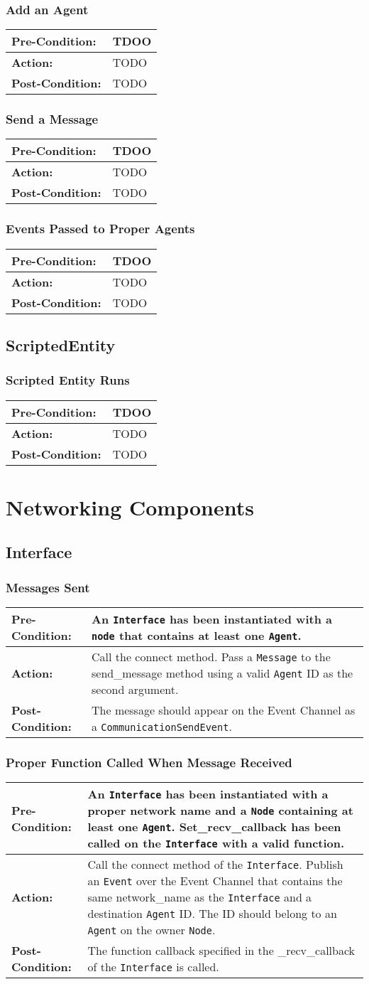 \documentclass[titlepage]{article}
\newcommand{\testcase}[3]{
    \begin{center}
    \begin{tabular}{| l | p{0.7\textwidth}|}
        \hline
        \rowcolor[gray]{0.8}\textbf{Pre-Condition:} & #1 \\ \hline
        \textbf{Action:} & #2 \\ \hline
        \rowcolor[gray]{0.8}\textbf{Post-Condition:} & #3 \\ \hline
    \end{tabular}
    \end{center}
}
\begin{document}
\subsubsection{Add an Agent}
\testcase{TDOO}{TODO}{TODO}

\subsubsection{Send a Message}
\testcase{TDOO}{TODO}{TODO}

\subsubsection{Events Passed to Proper Agents}
\testcase{TDOO}{TODO}{TODO}

\subsection{ScriptedEntity}
\subsubsection{Scripted Entity Runs}
\testcase{TDOO}{TODO}{TODO}


\section{Networking Components}
\subsection{Interface}
\subsubsection{Messages Sent}
\testcase{An \texttt{Interface} has been instantiated with a \texttt{node} that contains at least one
\texttt{Agent}.}{Call the connect method. Pass a \texttt{Message} to the send\_message method using a valid
\texttt{Agent} ID as the second argument.}{The message should appear on the Event Channel as a
\texttt{CommunicationSendEvent}.}

\subsubsection{Proper Function Called When Message Received}
\testcase{An \texttt{Interface} has been instantiated with a proper network name and a \texttt{Node} containing at least
one \texttt{Agent}. Set\_recv\_callback has been called on the \texttt{Interface} with a valid function.}{Call the connect method of the \texttt{Interface}.  Publish an \texttt{Event} over the Event
Channel that contains the same network\_name as the \texttt{Interface} and a destination \texttt{Agent} ID.  The ID
should belong to an \texttt{Agent} on the owner \texttt{Node}.}{The function callback specified in the \_recv\_callback
of the \texttt{Interface} is called.}
\end{document}
